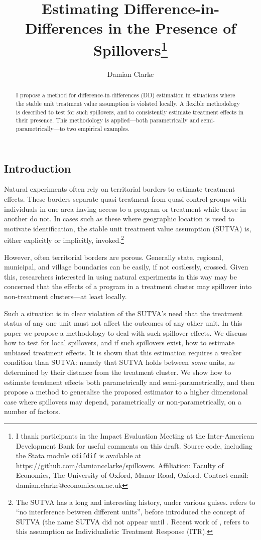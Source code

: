 \documentclass{article}
\title{Estimating Difference-in-Differences in the Presence of Spillovers\footnote{
I thank participants in the Impact Evaluation Meeting at the Inter-American 
Development Bank for useful comments on this draft. Source code, including the
Stata module \texttt{cdifdif} is available at 
https://github.com/damiancclarke/spillovers.  Affiliation: Faculty of Economics, 
The University of Oxford, Manor Road, Oxford. Contact email: 
damian.clarke@economics.ox.ac.uk}}
\author{Damian Clarke}
\begin{document}
\maketitle

\begin{abstract}
I propose a method for difference-in-differences (DD) estimation in situations 
where the stable unit treatment value assumption is violated locally.  A flexible 
methodology is described to test for such spillovers, and to consistently estimate 
treatment effects in their presence.  This methodology is applied---both 
parametrically and semi-parametrically---to two empirical examples.
\end{abstract}

\newpage
\begin{spacing}{1.1}
\section{Introduction}
Natural experiments often rely on territorial borders to estimate treatment 
effects.  These borders separate quasi-treatment from quasi-control groups with
individuals in one area having access to a program or treatment while those in 
another do not.  In cases such as these where geographic location is used to 
motivate identification, the stable unit treatment value assumption (SUTVA) is, 
either explicitly or implicitly, invoked.\footnote{The SUTVA has a long and 
interesting history, under various guises. \citet{Cox1958} refers to ``no 
interference between different units'', before \citet{Rubin1978} introduced the 
concept of SUTVA (the name SUTVA did not appear until \citet{Rubin1980}.  Recent 
work of \citet{Manski2013}, refers to this assumption as Individualistic 
Treatment Response (ITR).}

However, often territorial borders are porous.  Generally state, regional,
municipal, and village boundaries can be easily, if not costlessly, crossed.
Given this, researchers interested in using natural experiments in this way may
be concerned that the effects of a program in a treatment cluster may spillover 
into non-treatment clusters---at least locally.

Such a situation is in clear violation of the SUTVA's need that the treatment
status of any one unit must not affect the outcomes of any other unit.  In this 
paper we propose a methodology to deal with such spillover effects.  We
discuss how to test for local spillovers, and if such spillovers exist, how to 
estimate unbiased treatment effects.  It is shown that this estimation requires
a weaker condition than SUTVA: namely that SUTVA holds between \emph{some} units, 
as determined by their distance from the treatment cluster.  We show how to 
estimate treatment effects both parametrically and semi-parametrically, and then
propose a method to generalise the proposed estimator to a higher dimensional 
case where spillovers may depend, parametrically or non-parametrically, on a number 
of factors.


\end{spacing}
\end{document}

